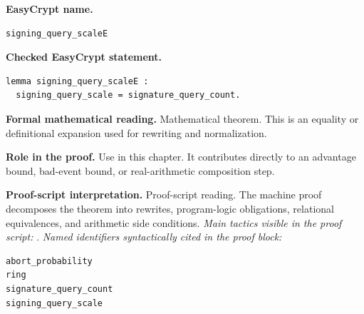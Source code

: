 \begin{formaltheorem}
\noindent\textbf{EasyCrypt name.}
\begin{lstlisting}[language=EasyCrypt,basicstyle=\ttfamily\scriptsize]
signing_query_scaleE
\end{lstlisting}
\noindent\textbf{Checked EasyCrypt statement.}
\begin{lstlisting}[language=EasyCrypt,basicstyle=\ttfamily\scriptsize]
lemma signing_query_scaleE :
  signing_query_scale = signature_query_count.
\end{lstlisting}
\noindent\textbf{Formal mathematical reading.}
Mathematical theorem. This is an equality or definitional expansion used for rewriting and normalization.

\noindent\textbf{Role in the proof.}
Use in this chapter. It contributes directly to an advantage bound, bad-event bound, or real-arithmetic composition step.

\noindent\textbf{Proof-script interpretation.}
Proof-script reading. The machine proof decomposes the theorem into rewrites, program-logic obligations, relational equivalences, and arithmetic side conditions.
\emph{Main tactics visible in the proof script:} .
\emph{Named identifiers syntactically cited in the proof block:}
\begin{lstlisting}[language=EasyCrypt,basicstyle=\ttfamily\scriptsize]
abort_probability
ring
signature_query_count
signing_query_scale
\end{lstlisting}

\end{formaltheorem}

